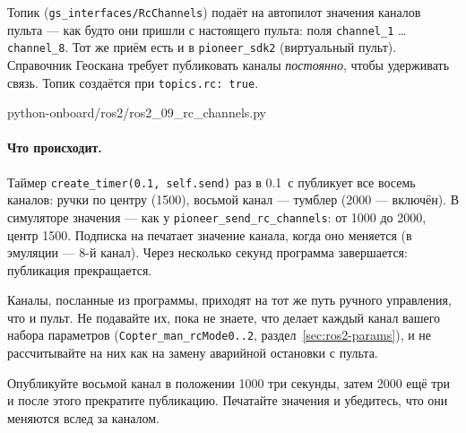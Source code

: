Топик  (\texttt{gs\_interfaces/\allowbreak RcChannels}) подаёт на автопилот значения каналов пульта --- как будто они пришли с настоящего пульта: поля \verb|channel_1| \ldots \verb|channel_8|. Тот же приём есть и в \texttt{pioneer\_sdk2} (виртуальный пульт). Справочник Геоскана требует публиковать каналы \emph{постоянно}, чтобы удерживать связь. Топик создаётся при \verb|topics.rc: true|.

\begin{codefile}[python]{python-onboard/ros2/ros2_09_rc_channels.py}
\end{codefile}

\paragraph{Что происходит.} Таймер \verb|create_timer(0.1, self.send)| раз в 0.1~с публикует все восемь каналов: ручки по центру (1500), восьмой канал --- тумблер (2000 --- включён). В симуляторе значения --- как у \verb|pioneer_send_rc_channels|: от 1000 до 2000, центр 1500. Подписка на  печатает значение канала, когда оно меняется (в эмуляции --- 8-й канал). Через несколько секунд программа завершается: публикация прекращается.

\begin{warnbox}[RC в воздухе]
Каналы, посланные из программы, приходят на тот же путь ручного управления, что и пульт. Не подавайте их, пока не знаете, что делает каждый канал вашего набора параметров (\texttt{Copter\_man\_rcMode0..2}, раздел~\ref{sec:ros2-params}), и не рассчитывайте на них как на замену аварийной остановки с пульта.
\end{warnbox}

\begin{taskbox}
Опубликуйте восьмой канал в положении 1000 три секунды, затем 2000 ещё три и после этого прекратите публикацию. Печатайте значения  и убедитесь, что они меняются вслед за каналом.
\end{taskbox}

